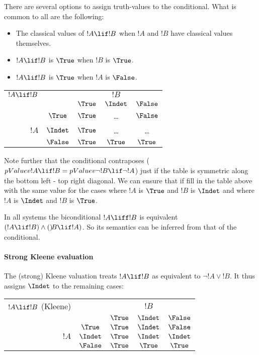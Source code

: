 \documentclass[../../../include/open-logic-section]{subfiles}
\begin{document}


There are several options to assign truth-values to the conditional. What is common to all are the following:

\begin{itemize}
  \item The classical values of $!A \lif !B$ when $!A$ and $!B$ have classical values themselves.
  \item $!A \lif !B$ is $\True$ when $!B$ is $\True$.
  \item $!A \lif !B$ is $\True$ when $!A$ is $\False$.
\end{itemize}

\begin{center}
  \begin{tabular}{|rc|ccc|} \hline 
     $!A \lif !B$  & & & $!B$ &  \\
     & & $\True$ & $\Indet$ & $\False$ \\
    \hline \hline 
    & $\True$ & $\True$ & \ldots & $\False$ \\ 
    $!A$ & $\Indet$ & $\True$ & \ldots & \ldots \\ 
    & $\False$ & $\True$ & $\True$ & $\True$ \\
    \hline 
  \end{tabular}
\end{center} 

Note further that the conditional contraposes ($pValue{v}{!A \lif !B} = pValue{v}{\lnot !B \lif \lnot !A}$) just if the table is symmetric along the bottom left - top right diagonal. We can ensure that if fill in the table above with the same value for the cases where $!A$ is $\True$ and $!B$ is $\Indet$ and where $!A$ is $\Indet$ and $!B$ is $\True$.

In all systems the biconditional $!A \liff !B$ is equivalent $(!A \lif !B) \land ()\!B \lif !A)$. So its semantics can be inferred from that of the conditional. 

\paragraph{Strong Kleene evaluation} The (strong) Kleene valuation treats $!A \lif !B$ as equivalent to $\lnot !A \lor !B$. It thus assigns $\Indet$ to the remaining cases:

\begin{center}
  \begin{tabular}{|rc|ccc|} \hline 
     $!A \lif !B$ (Kleene) & & & $!B$ &  \\
     & & $\True$ & $\Indet$ & $\False$ \\
    \hline \hline 
    & $\True$ & $\True$ & $\Indet$ & $\False$ \\ 
    $!A$ & $\Indet$ & $\True$ & $\Indet$ & $\Indet$ \\ 
    & $\False$ & $\True$ & $\True$ & $\True$ \\
    \hline 
  \end{tabular}
\end{center} 
\end{document}
